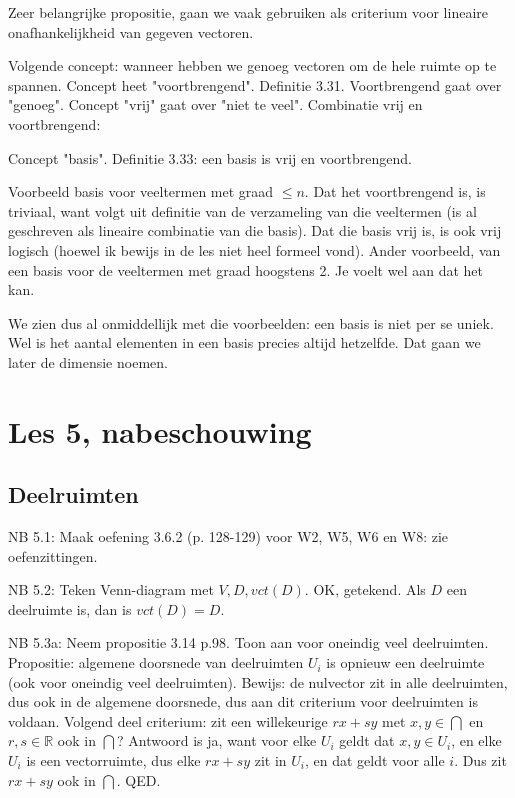 \documentclass{article}
\begin{document}
Zeer belangrijke propositie, gaan we vaak gebruiken als criterium voor lineaire onafhankelijkheid van gegeven vectoren. 

Volgende concept: wanneer hebben we genoeg vectoren om de hele ruimte op te spannen. Concept heet "voortbrengend". Definitie 3.31. Voortbrengend gaat over "genoeg". Concept "vrij" gaat over "niet te veel". Combinatie vrij en voortbrengend: 

Concept "basis". Definitie 3.33: een basis is vrij en voortbrengend. 

Voorbeeld basis voor veeltermen met graad $\leq n$. Dat het voortbrengend is, is triviaal, want volgt uit definitie van de verzameling van die veeltermen (is al geschreven als lineaire combinatie van die basis). Dat die basis vrij is, is ook vrij logisch (hoewel ik bewijs in de les niet heel formeel vond). 
Ander voorbeeld, van een basis voor de veeltermen met graad hoogstens 2. Je voelt wel aan dat het kan. 

We zien dus al onmiddellijk met die voorbeelden: een basis is niet per se uniek. Wel is het aantal elementen in een basis precies altijd hetzelfde. Dat gaan we later de dimensie noemen. 




\section{Les 5, nabeschouwing}

\subsection{Deelruimten} 
NB 5.1: Maak oefening 3.6.2 (p. 128-129) voor W2, W5, W6 en W8: zie oefenzittingen. 

NB 5.2:  Teken Venn-diagram met $V, D, vct(D)$. OK, getekend. Als $D$ een deelruimte is, dan is $vct(D)=D$. 

NB 5.3a:  Neem propositie 3.14 p.98. Toon aan voor oneindig veel deelruimten. 
Propositie: algemene doorsnede van deelruimten $U_i$ is opnieuw een deelruimte (ook voor oneindig veel deelruimten). 
Bewijs: de nulvector zit in alle deelruimten, dus ook in de algemene doorsnede,  dus aan dit criterium voor deelruimten is voldaan. Volgend deel criterium: zit een willekeurige $rx +sy$ met $x,y \in \bigcap$ en $r,s \in \mathbb{R}$ ook in $\bigcap$? Antwoord is ja, want voor elke $U_i$ geldt dat $x,y \in U_i$, en elke $U_i$ is een vectorruimte, dus elke $rx +sy$ zit in $U_i$, en dat geldt voor alle $i$. Dus zit $rx +sy$ ook in $\bigcap$. QED. 
\end{document}
